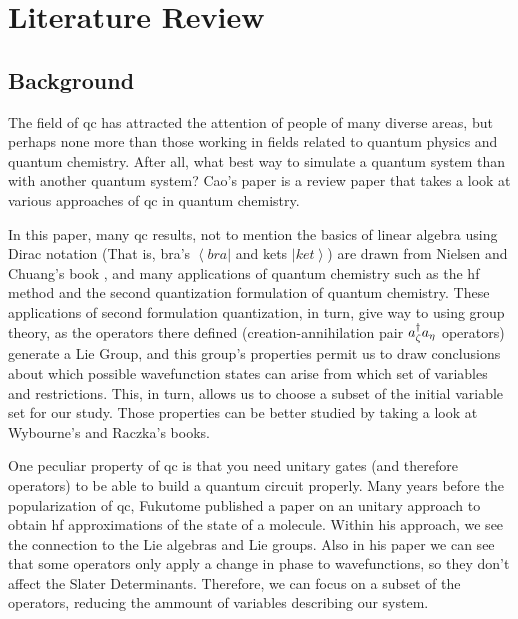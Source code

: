 \documentclass{aux/ttuthes2007}
\newcommand{\bra}[1]{\ensuremath{\left\langle#1\right\vert}}
\newcommand{\ket}[1]{\ensuremath{\left|#1\right\rangle}}
\newcommand{\anig}[1]{a_{\go{#1}}}
\newcommand{\creg}[1]{a^\dagger_{\go{#1}}}
\newcommand{\go}[1]{
		\IfEqCase{#1}{
			{0}{\zeta}
			{1}{\eta}
			{2}{\iota}
			{3}{\kappa}
		}[\PackageError{unocorb}{Undefined option to go: #1}{}]
}
\begin{document}
\chapter{\textbf{Literature Review}}\label{chap:literature}

\section{\textbf{Background}}
The field of \gls{qc} has attracted the attention of people of many diverse areas, but perhaps none more than those working in fields related to quantum physics and quantum chemistry. After all, what best way to simulate a quantum system than with another quantum system? Cao's paper  is a review paper that takes a look at various approaches of \gls{qc} in quantum chemistry.

	In this paper, many \gls{qc} results, not to mention the basics of linear algebra using Dirac notation (That is, bra's $\bra {bra}$ and kets $\ket{ket}$) are drawn from Nielsen and Chuang's book \cite{nielsen}, and many applications of quantum chemistry such as the \gls{hf} method and the second quantization formulation of quantum chemistry.
	These applications of second formulation quantization, in turn, give way to using group theory, as the operators there defined (creation-annihilation pair $\creg 0\anig 1$ operators) generate a Lie Group, and this group's properties permit us to draw conclusions about which possible wavefunction states can arise from which set of variables and restrictions. This, in turn, allows us to choose a subset of the initial variable set for our study. Those properties can be better studied by taking a look at Wybourne's  and Raczka's  books.
	
	One peculiar property of \gls{qc} is that you need unitary gates (and therefore operators) to be able to build a quantum circuit properly. Many years before the popularization of \gls{qc}, Fukutome  published a paper on an unitary approach to obtain \gls{hf} approximations of the state of a molecule. Within his approach, we see the connection to the Lie algebras and Lie groups. Also in his paper we can see that some operators only apply a change in phase to wavefunctions, so they don't affect the Slater Determinants. Therefore, we can focus on a subset of the operators, reducing the ammount of variables describing our system.
\end{document}
